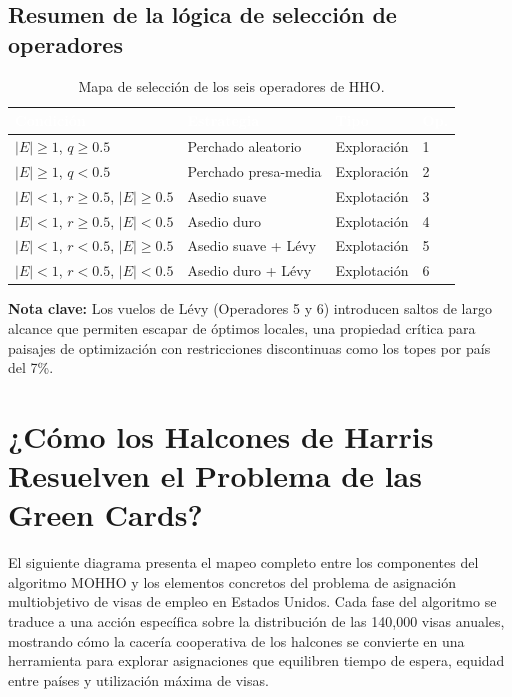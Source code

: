 \documentclass[12pt,letterpaper]{article}
\begin{document}
\subsection{Resumen de la lógica de selección de operadores}

\begin{table}[H]
\centering
\caption{Mapa de selección de los seis operadores de HHO.}
\label{tab:operadores}
\renewcommand{\arraystretch}{1.3}
\begin{tabular}{llll}
\toprule
\rowcolor{tablehead}
\textcolor{white}{\textbf{Condición}} & \textcolor{white}{\textbf{Estrategia}} & \textcolor{white}{\textbf{Tipo}} & \textcolor{white}{\textbf{Op.}} \\
\midrule
$|E| \geq 1$, $q \geq 0.5$ & Perchado aleatorio & Exploración & 1 \\
\rowcolor{gray!8}
$|E| \geq 1$, $q < 0.5$ & Perchado presa-media & Exploración & 2 \\
$|E| < 1$, $r \geq 0.5$, $|E| \geq 0.5$ & Asedio suave & Explotación & 3 \\
\rowcolor{gray!8}
$|E| < 1$, $r \geq 0.5$, $|E| < 0.5$ & Asedio duro & Explotación & 4 \\
$|E| < 1$, $r < 0.5$, $|E| \geq 0.5$ & Asedio suave + Lévy & Explotación & 5 \\
\rowcolor{gray!8}
$|E| < 1$, $r < 0.5$, $|E| < 0.5$ & Asedio duro + Lévy & Explotación & 6 \\
\bottomrule
\end{tabular}
\end{table}

\begin{yellowbox}
\textbf{Nota clave:} Los vuelos de Lévy (Operadores 5 y 6) introducen saltos de largo alcance que permiten escapar de óptimos locales, una propiedad crítica para paisajes de optimización con restricciones discontinuas como los topes por país del 7\%.
\end{yellowbox}

\newpage
\section{¿Cómo los Halcones de Harris Resuelven el Problema de las Green Cards?}

El siguiente diagrama presenta el mapeo completo entre los componentes del algoritmo MOHHO y los elementos concretos del problema de asignación multiobjetivo de visas de empleo en Estados Unidos. Cada fase del algoritmo se traduce a una acción específica sobre la distribución de las 140,000 visas anuales, mostrando cómo la cacería cooperativa de los halcones se convierte en una herramienta para explorar asignaciones que equilibren tiempo de espera, equidad entre países y utilización máxima de visas.
\end{document}
